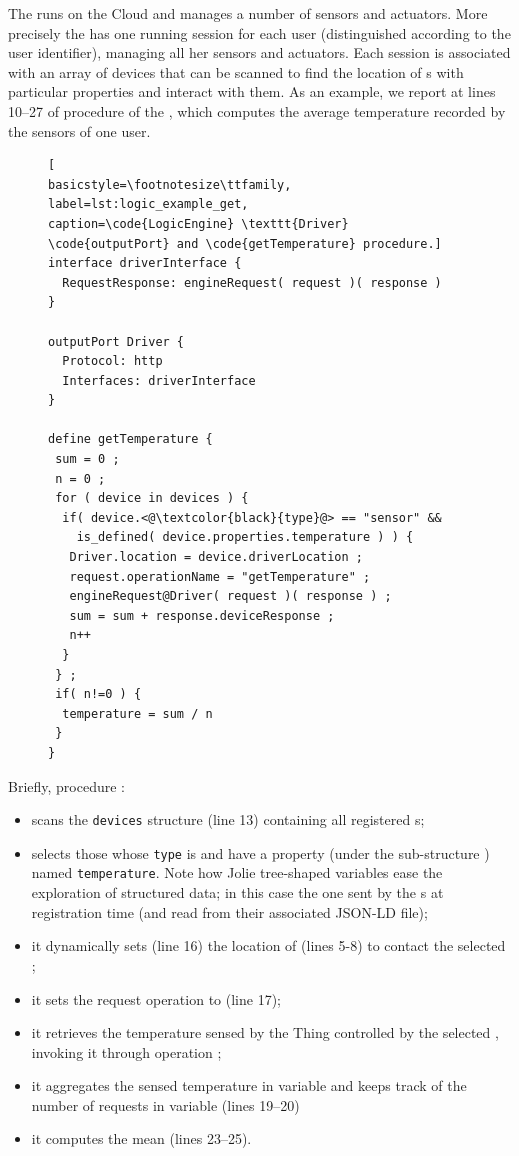 The  runs on the Cloud and manages a number of sensors and
actuators. More precisely the  has one running session for
each user (distinguished according to the user identifier), managing all her
sensors and actuators. Each session is associated with an array of devices
that can be scanned to find the location of s with particular
properties and interact with them. As an example, we report at lines 10--27 of
 procedure  of the
, which computes the average temperature recorded by the
sensors of one user.
%
\begin{figure}[b]
\begin{lstlisting}[
basicstyle=\footnotesize\ttfamily,
label=lst:logic_example_get,
caption=\code{LogicEngine} \texttt{Driver} \code{outputPort} and \code{getTemperature} procedure.]
interface driverInterface {
  RequestResponse: engineRequest( request )( response )
}

outputPort Driver {
  Protocol: http
  Interfaces: driverInterface
}

define getTemperature {
 sum = 0 ;
 n = 0 ;
 for ( device in devices ) {
  if( device.<@\textcolor{black}{type}@> == "sensor" &&
    is_defined( device.properties.temperature ) ) {
   Driver.location = device.driverLocation ;
   request.operationName = "getTemperature" ;
   engineRequest@Driver( request )( response ) ;
   sum = sum + response.deviceResponse ;
   n++
  }
 } ;
 if( n!=0 ) {
  temperature = sum / n
 }
}
\end{lstlisting}
\end{figure}
%
Briefly, procedure :

\begin{itemize}
  \item scans the \lstinline{devices} structure (line 13) containing all
  registered s;
  \item selects those whose {\small\texttt{type}} is  and have
  a property (under the sub-structure ) named
  \lstinline{temperature}. Note how Jolie tree-shaped variables ease the
  exploration of structured data; in this case the one sent by the
  s at registration time (and read from their associated JSON-LD
  file);
  \item it dynamically sets (line 16) the location of 
  (lines 5-8) to contact the selected ;
  \item it sets the request operation to  (line 17);
  \item it retrieves the temperature sensed by the Thing controlled by the
  selected , invoking it through operation ;
  \item it aggregates the sensed temperature in variable  and keeps
  track of the number of requests in variable  (lines 19--20)
  \item it computes the mean  (lines 23--25).
\end{itemize}
%

